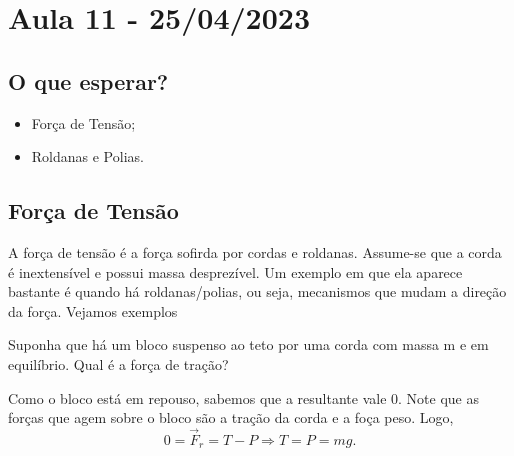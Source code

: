 \documentclass[physics_notes.tex]{subfiles}
\begin{document}
\section{Aula 11 - 25/04/2023}
\subsection{O que esperar?}
\begin{itemize}
	\item Força de Tensão;
	\item Roldanas e Polias.
\end{itemize}

\subsection{Força de Tensão}
A força de tensão é a força sofirda por cordas e roldanas. Assume-se que a corda é inextensível e possui massa
desprezível. Um exemplo em que ela aparece bastante é quando há roldanas/polias, ou seja, mecanismos que mudam a direção
da força. Vejamos exemplos
\begin{example}
	Suponha que há um bloco suspenso ao teto por uma corda com massa m e em equilíbrio. Qual é a força de tração?

	Como o bloco está em repouso, sabemos que a resultante vale 0. Note que as forças que agem sobre o bloco são a tração
	da corda e a foça peso. Logo,
	$$
		0 = \vec{F}_{r} = T - P \Rightarrow T = P = mg.
	$$
\end{example}
\end{document}
